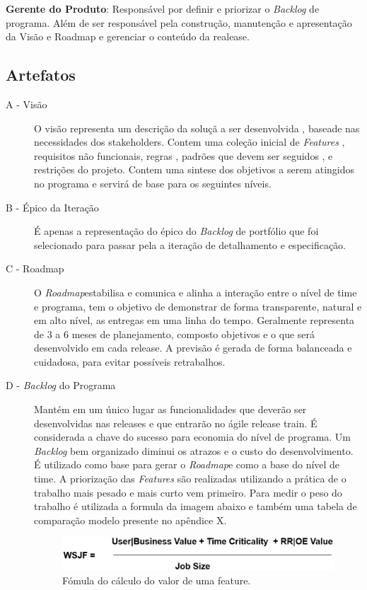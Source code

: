     \textbf{Gerente do Produto}: Responsável por definir e priorizar o \textit{Backlog} de programa.
    Além de ser responsável pela construção, manutenção e apresentação da Visão e Roadmap
    e gerenciar o conteúdo da realease.

  \subsection{Artefatos}

  \begin{description}
    \item[A - Visão]
    O visão representa um descrição da soluçã a ser desenvolvida , baseade nas necessidades
    dos stakeholders. Contem uma coleção inicial de \textit{Features}  , requisitos não funcionais,
    regras , padrões que devem ser seguidos , e restrições do projeto. Contem uma sintese dos
    objetivos a serem atingidos no programa e servirá de base para os seguintes níveis.\cite{vision}
    \item[B - Épico da Iteração]
    É apenas a representação do épico do \textit{Backlog} de portfólio que foi selecionado
    para passar pela a iteração de detalhamento e especificação.
    \item[C - Roadmap]
    O \textit{Roadmap}estabilisa e comunica e alinha a interação entre o nível de time e programa,
    tem o objetivo de demonstrar de forma transparente, natural e em alto nível, as entregas
    em uma linha do tempo. Geralmente representa de 3 a 6 meses de planejamento, composto objetivos
    e o que será desenvolvido em cada release. A previsão é gerada de forma balanceada e cuidadosa,
    para evitar possíveis retrabalhos. \cite{roadmap}
    \item[D - \textit{Backlog} do Programa]
    Mantém em um único lugar as funcionalidades que deverão ser desenvolvidas nas releases
    e que entrarão no ágile release train. É considerada a chave do sucesso para economia
    do nível de programa. Um \textit{Backlog} bem organizado diminui os atrazos e o custo do desenvolvimento.
    É utilizado como base para gerar o \textit{Roadmap}e como a base do nível de time\cite{programbacklog}.
    A priorização das \textit{Features}  são realizadas utilizando a prática de o trabalho mais pesado e
    mais curto vem primeiro. Para medir o peso do trabalho é utilizada a formula da imagem abaixo  e também
    uma tabela de comparação modelo presente no apêndice X\cite{wsjf}.

    \begin{figure}[H]
        \centering
      \includegraphics[keepaspectratio=true,scale=0.3]{figuras/WSJF-Formula.eps}
        \caption{Fómula do cálculo do valor de uma feature.}
        \label{fig:wsjf}
    \end{figure}


  \end{description}


